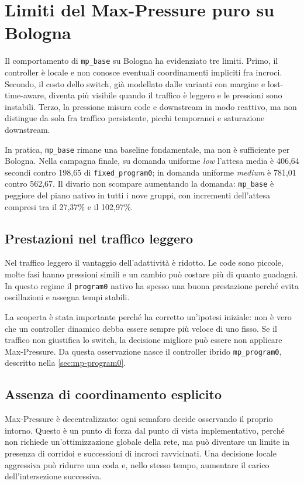 \documentclass[12pt,a4paper,oneside]{report}
\numberwithin{equation}{chapter}
\begin{document}
\section{Limiti del Max-Pressure puro su Bologna}

Il comportamento di \texttt{mp\_base} su Bologna ha evidenziato tre limiti.
Primo, il controller è locale e non conosce eventuali coordinamenti impliciti
fra incroci. Secondo, il costo dello switch, già modellato dalle varianti con
margine e lost-time-aware, diventa più visibile quando il traffico è leggero e
le pressioni sono instabili. Terzo, la pressione misura code e downstream in
modo reattivo, ma non distingue da sola fra traffico persistente, picchi
temporanei e saturazione downstream.

In pratica, \texttt{mp\_base} rimane una baseline fondamentale, ma non è
sufficiente per Bologna. Nella campagna finale, su domanda uniforme \emph{low}
l'attesa media è 406,64 secondi contro 198,65 di
\texttt{fixed\_program0}; in domanda uniforme \emph{medium} è 781,01 contro 562,67. Il
divario non scompare aumentando la domanda: \texttt{mp\_base} è peggiore del
piano nativo in tutti i nove gruppi, con incrementi dell'attesa compresi tra il
27,37\% e il 102,97\%.

\subsection{Prestazioni nel traffico leggero}

Nel traffico leggero il vantaggio dell'adattività è ridotto. Le code sono
piccole, molte fasi hanno pressioni simili e un cambio può costare più di
quanto guadagni. In questo regime il \texttt{program0} nativo ha spesso una
buona prestazione perché evita oscillazioni e assegna tempi stabili.

La scoperta è stata importante perché ha corretto un'ipotesi iniziale: non è
vero che un controller dinamico debba essere sempre più veloce di uno fisso.
Se il traffico non giustifica lo switch, la decisione migliore può essere
non applicare Max-Pressure. Da questa osservazione nasce il controller ibrido
\texttt{mp\_program0}, descritto nella \cref{sec:mp-program0}.

\subsection{Assenza di coordinamento esplicito}

Max-Pressure è decentralizzato: ogni semaforo decide osservando il proprio
intorno. Questo è un punto di forza dal punto di vista implementativo, perché
non richiede un'ottimizzazione globale della rete, ma può diventare un limite
in presenza di corridoi e successioni di incroci ravvicinati. Una decisione
locale aggressiva può ridurre una coda e, nello stesso tempo, aumentare il
carico dell'intersezione successiva.
\end{document}
